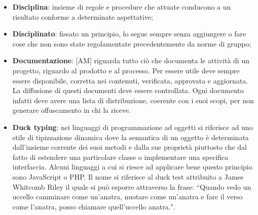 \begin{itemize}
	\item \textbf{Disciplina}: insieme di regole e procedure che attuate conducono a un risultato conforme a determinate aspettative;
	\item \textbf{Disciplinato}: fissato un principio, lo segue sempre senza aggiungere o fare cose che non sono state regolamentate precedentemente da norme di gruppo;
	\item \textbf{Documentazione}: [AM] riguarda tutto ciò che documenta le attività di un progetto, riguardo al prodotto e al processo.
	Per essere utile deve sempre essere disponibile, corretta nei contenuti, verificata, approvata e aggiornata. La diffusione di questi documenti deve essere controllata. Ogni documento infatti deve avere una lista di distribuzione, coerente con i suoi scopi, per non generare offuscamento in chi la riceve.
	\item \textbf{Duck typing}: nei linguaggi di programmazione ad oggetti si riferisce ad uno stile di tipizzazione dinamica dove la semantica di un oggetto è determinata dall'insieme corrente dei suoi metodi e dalla sue proprietà piuttosto che dal fatto di estendere una particolare classe o implementare una specifica interfaccia. \newline
Alcuni linguaggi a cui si riesce ad applicare bene questo principio sono JavaScript o PHP.
Il nome si riferisce al duck test attribuito a James Whitcomb Riley il quale si può esporre attraverso la frase: ``Quando vedo un uccello camminare come un'anatra, nuotare come un'anatra e fare il verso come l'anatra, posso chiamare quell'uccello anatra.".

\end{itemize}
